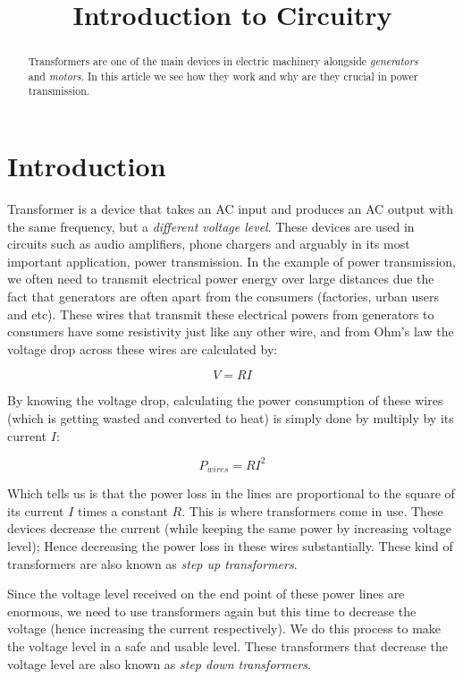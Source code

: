 \documentclass{article}
\begin{document}
	
	\title{Introduction to Circuitry}
	\author{}
	
	\maketitle
	
	\begin{abstract}
	Transformers are one of the main devices in electric machinery alongside \textit{generators} and \textit{motors}.
	In this article we see how they work and why are they crucial in power transmission.
	\end{abstract}
	
	\section{Introduction}
	Transformer is a device that takes an AC input and produces an AC output with the same frequency, but a \textit{different voltage level}.
	These devices are used in circuits such as audio amplifiers, phone chargers and arguably in its most important application, power transmission.
	In the example of power transmission, we often need to transmit electrical power energy over large distances due the fact that generators are often apart from the consumers (factories, urban users and etc). These wires that transmit these electrical powers from generators to consumers have some resistivity just like any other wire, and from Ohm's law the voltage drop across these wires are calculated by:
	
	$$V = RI$$
	
	By knowing the voltage drop, calculating the power consumption of these wires (which is getting wasted and converted to heat) is simply done by multiply by its current $I$:
	
	$$P_{wires} = RI^2 $$
	
	Which tells us is that the power loss in the lines are proportional to the square of its current $I$ times a constant $R$.
	This is where transformers come in use.
	These devices decrease the current (while keeping the same power by increasing voltage level); Hence decreasing the power loss in these wires substantially.
	These kind of transformers are also known as \textit{step up transformers}.
	
	Since the voltage level received on the end point of these power lines are enormous, we need to use transformers again but this time to decrease the voltage (hence increasing the current respectively).
	We do this process to make the voltage level in a safe and usable level. These transformers that decrease the voltage level are also known as \textit{step down transformers}.
	
\end{document}
